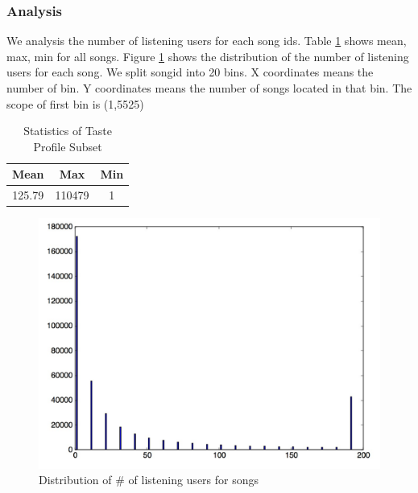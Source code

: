 \documentclass[11pt]{article} %
\begin{document}
\subsubsection{Analysis}
We analysis the number of listening users  for each song ids. Table \ref{table: stats-song} shows mean, max, min for all songs. Figure \ref{fig:distr-song} shows the distribution of the number of listening users for each song. We split songid into 20 bins. X coordinates means the number of bin. Y coordinates means the number of songs located in that bin. The scope of first bin is (1,5525)

\begin{table}[htdp]
\caption{Statistics of Taste Profile Subset}
\begin{center}
\begin{tabular}{|c|c|c|}
\hline
Mean & Max & Min \\ \hline
125.79 & 110479 & 1 \\ \hline
\end{tabular}
\end{center}
\label{table: stats-song}
\end{table}%

\begin{figure}[htbp]
\begin{center}
\includegraphics[scale=0.3]{dist_songs.png}
\caption{Distribution of \# of listening users for songs }
\label{fig:distr-song}
\end{center}
\end{figure}
\end{document}
